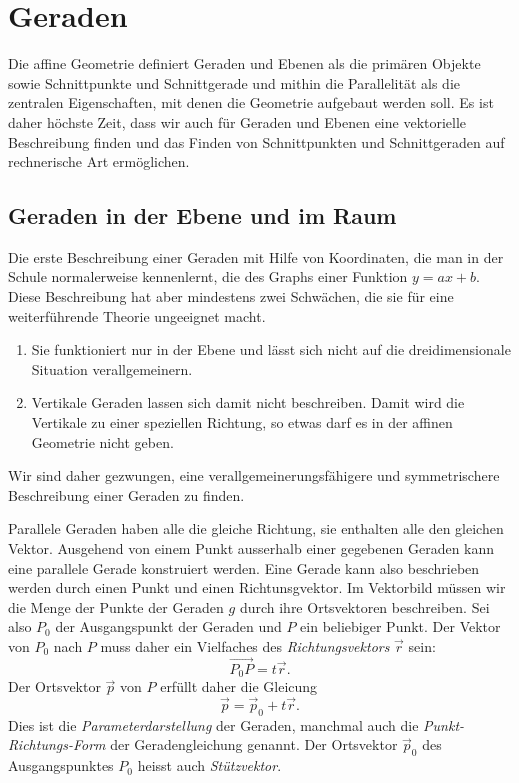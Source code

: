 %
%
%
\section{Geraden%
\label{skript:section:geraden}}
Die affine Geometrie definiert Geraden und Ebenen als die primären Objekte
sowie Schnittpunkte und Schnittgerade und mithin die Parallelität als die
zentralen Eigenschaften, mit denen die Geometrie aufgebaut werden soll.
Es ist daher höchste Zeit, dass wir auch für Geraden und Ebenen eine
vektorielle Beschreibung finden und das Finden von Schnittpunkten
und Schnittgeraden auf rechnerische Art ermöglichen.

%
%
\subsection{Geraden in der Ebene und im Raum}
Die erste Beschreibung einer Geraden mit Hilfe von Koordinaten, die man in
der Schule normalerweise kennenlernt, die des Graphs einer Funktion
$y=ax+b$.
Diese Beschreibung hat aber mindestens zwei Schwächen, die sie für eine
weiterführende Theorie ungeeignet macht.
\begin{enumerate}
\item Sie funktioniert nur in der Ebene und lässt sich nicht auf die
dreidimensionale Situation verallgemeinern.
\item Vertikale Geraden lassen sich damit nicht beschreiben.
Damit wird die Vertikale zu einer speziellen Richtung, so etwas darf
es in der affinen Geometrie nicht geben.
\end{enumerate}
Wir sind daher gezwungen, eine verallgemeinerungsfähigere und symmetrischere
Beschreibung einer Geraden zu finden.

Parallele Geraden haben alle die gleiche Richtung, sie enthalten alle
den gleichen Vektor.
Ausgehend von einem Punkt ausserhalb einer gegebenen Geraden kann eine
parallele Gerade konstruiert werden.
Eine Gerade kann also beschrieben werden durch einen Punkt und einen
Richtunsgvektor.
Im Vektorbild müssen wir die Menge der Punkte der Geraden $g$ durch ihre
Ortsvektoren beschreiben.
Sei also $P_0$ der Ausgangspunkt der Geraden und $P$ ein beliebiger
Punkt.
Der Vektor von $P_0$ nach $P$ muss daher ein Vielfaches des
{\em Richtungsvektors} $\vec{r}$ sein:
\[
\overrightarrow{P_0P} = t\vec{r}.
\]
Der Ortsvektor $\vec{p}$ von $P$ erfüllt daher die Gleicung
\begin{equation}
\vec{p} = \vec{p}_0 + t\vec{r}.
\label{skript:punktrichtung}
\end{equation}
Dies ist die {\em Parameterdarstellung} der Geraden, manchmal auch die
{\em Punkt-Richtungs-Form} der Geradengleichung genannt.
Der Ortsvektor $\vec{p}_0$ des Ausgangspunktes $P_0$ heisst auch
{\em Stützvektor}.

